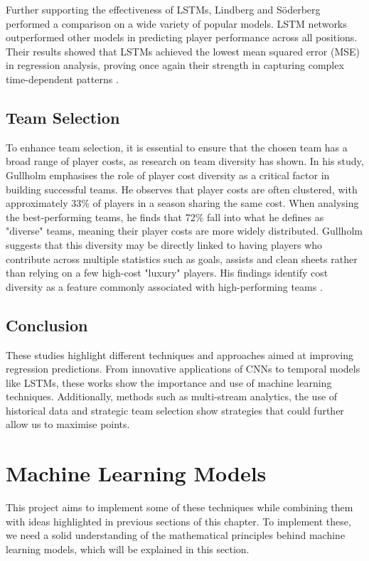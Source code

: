 Further supporting the effectiveness of LSTMs, Lindberg and Söderberg  performed a comparison on a wide variety of popular models. LSTM networks outperformed other models in predicting player performance across all positions. Their results showed that LSTMs achieved the lowest mean squared error (MSE) in regression analysis, proving once again their strength in capturing complex time-dependent patterns \cite{lindberg2020comparison}.

\subsection{Team Selection}

To enhance team selection, it is essential to ensure that the chosen team has a broad range of player costs, as research on team diversity has shown. In his study, Gullholm emphasises the role of player cost diversity as a critical factor in building successful teams. He observes that player costs are often clustered, with approximately 33\% of players in a season sharing the same cost. When analysing the best-performing teams, he finds that 72\% fall into what he defines as "diverse" teams, meaning their player costs are more widely distributed. Gullholm suggests that this diversity may be directly linked to having players who contribute across multiple statistics such as goals, assists and clean sheets rather than relying on a few high-cost "luxury" players. His findings identify cost diversity as a feature commonly associated with high-performing teams \cite{GullholmJosef2022DiKF}.

\subsection{Conclusion}

These studies highlight different techniques and approaches aimed at improving regression predictions. From innovative applications of CNNs to temporal models like LSTMs, these works show the importance and use of machine learning techniques. Additionally, methods such as multi-stream analytics, the use of historical data and strategic team selection show strategies that could further allow us to maximise points. 

\section{Machine Learning Models}

This project aims to implement some of these techniques while combining them with ideas highlighted in previous sections of this chapter. To implement these, we need a solid understanding of the mathematical principles behind machine learning models, which will be explained in this section. 

